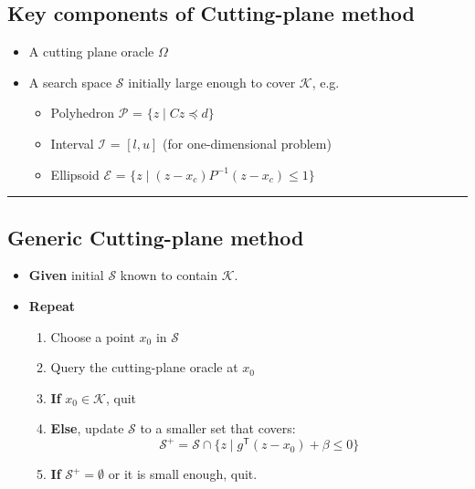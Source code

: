 \documentclass[
]{article}
\providecommand{\tightlist}{%
  \setlength{\itemsep}{0pt}\setlength{\parskip}{0pt}}
\begin{document}
\subsection{Key components of Cutting-plane
method}\label{key-components-of-cutting-plane-method}

\begin{itemize}
\tightlist
\item
  A cutting plane oracle \(\Omega\)
\item
  A search space \(\mathcal{S}\) initially large enough to cover
  \(\mathcal{K}\), e.g.

  \begin{itemize}
  \tightlist
  \item
    Polyhedron \(\mathcal{P}\) = \(\{z \mid C z \preceq d \}\)
  \item
    Interval \(\mathcal{I}\) = \([l, u]\) (for one-dimensional problem)
  \item
    Ellipsoid \(\mathcal{E}\) =
    \(\{z \mid (z-x_c)P^{-1}(z-x_c) \le 1 \}\)
  \end{itemize}
\end{itemize}

\begin{center}\rule{0.5\linewidth}{0.5pt}\end{center}

\subsection{Generic Cutting-plane
method}\label{generic-cutting-plane-method}

\begin{itemize}
\tightlist
\item
  \textbf{Given} initial \(\mathcal{S}\) known to contain
  \(\mathcal{K}\).
\item
  \textbf{Repeat}

  \begin{enumerate}
  \def\labelenumi{\arabic{enumi}.}
  \tightlist
  \item
    Choose a point \(x_0\) in \(\mathcal{S}\)
  \item
    Query the cutting-plane oracle at \(x_0\)
  \item
    \textbf{If} \(x_0 \in \mathcal{K}\), quit
  \item
    \textbf{Else}, update \(\mathcal{S}\) to a smaller set that covers:
    \[\mathcal{S}^+ = \mathcal{S} \cap \{z \mid g^\mathsf{T} (z - x_0) + \beta \le 0\}\]
  \item
    \textbf{If} \(\mathcal{S}^+ = \emptyset\) or it is small enough,
    quit.
  \end{enumerate}
\end{itemize}
\end{document}
